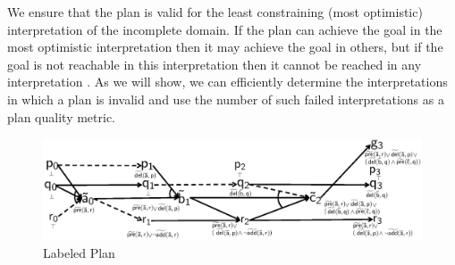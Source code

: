 \documentclass{article}
\def\citep#1{\cite{#1}} \def\citet#1{\citeA{#1}}
\begin{document}
We ensure that the plan is valid for the
least constraining (most optimistic) interpretation of the incomplete domain. 
If the plan can achieve the goal in the most optimistic interpretation then it
may achieve the goal in others, but if the goal is not reachable in this
interpretation then it cannot be reached in any interpretation \citep{USU-CS-TR-11-001}.  As we
will show, we can efficiently determine the interpretations in which a plan is
invalid and use the number of such failed interpretations as a plan quality metric.


\begin{figure}[t]\centering
\vspace*{-1cm}
\includegraphics[width=.9\linewidth]{example.eps}
\vspace*{-1cm}\caption{\label{fig:example} Labeled Plan}
\end{figure}


\end{document}
